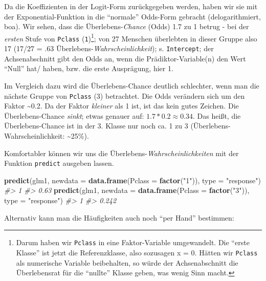 \documentclass[12pt,ngerman,]{book}
\makeatletter
\newenvironment{Shaded}{\begin{snugshade}}{\end{snugshade}}
\newcommand{\KeywordTok}[1]{\textcolor[rgb]{0.13,0.29,0.53}{\textbf{{#1}}}}
\newcommand{\DataTypeTok}[1]{\textcolor[rgb]{0.13,0.29,0.53}{{#1}}}
\newcommand{\StringTok}[1]{\textcolor[rgb]{0.31,0.60,0.02}{{#1}}}
\newcommand{\CommentTok}[1]{\textcolor[rgb]{0.56,0.35,0.01}{\textit{{#1}}}}
\newcommand{\NormalTok}[1]{{#1}}
\let\rmarkdownfootnote\footnote%
\def\footnote{\protect\rmarkdownfootnote}
\newenvironment{kframe}{%
\medskip{}
\setlength{\fboxsep}{.8em}
 \def\at@end@of@kframe{}%
 \ifinner\ifhmode%
  \def\at@end@of@kframe{\end{minipage}}%
  \begin{minipage}{\columnwidth}%
 \fi\fi%
 \def\FrameCommand##1{\hskip\@totalleftmargin \hskip-\fboxsep
 \colorbox{shadecolor}{##1}\hskip-\fboxsep
     \hskip-\linewidth \hskip-\@totalleftmargin \hskip\columnwidth}%
 \MakeFramed {\advance\hsize-\width
   \@totalleftmargin\z@ \linewidth\hsize
   \@setminipage}}%
 {\par\unskip\endMakeFramed%
 \at@end@of@kframe}
\renewenvironment{Shaded}{\begin{kframe}}{\end{kframe}}
\makeatother
\begin{document}
Da die Koeffizienten in der Logit-Form zurückgegeben werden, haben wir
sie mit der Exponential-Funktion in die ``normale'' Odds-Form gebracht
(delogarithmiert, boa). Wir sehen, dass die Überlebens-\emph{Chance}
(Odds) 1.7 zu 1 betrug - bei der \emph{ersten} Stufe von \texttt{Pclass}
(\texttt{1})\footnote{Darum haben wir \texttt{Pclass} in eine
  Faktor-Variable umgewandelt. Die ``erste Klasse'' ist jetzt die
  Referenzklasse, also sozusagen x = 0. Hätten wir \texttt{Pclass} als
  numerische Variable beibehalten, so würde der Achsenabschnitt die
  Überlebensrat für die ``nullte'' Klasse geben, was wenig Sinn macht.};
von 27 Menschen überlebten in dieser Gruppe also 17 (17/27 = .63
Überlebens-\emph{Wahrscheinlichkeit}); s. \texttt{Intercept}; der
Achsenabschnitt gibt den Odds an, wenn die Prädiktor-Variable(n) den
Wert ``Null'' hat/ haben, bzw. die erste Ausprägung, hier 1.

Im Vergleich dazu wird die Überlebens-Chance deutlich schlechter, wenn
man die nächste Gruppe von \texttt{Pclass} (3) betrachtet. Die Odds
verändern sich um den Faktor \textasciitilde{}0.2. Da der Faktor
\emph{kleiner} als 1 ist, ist das kein gutes Zeichen. Die
Überlebens-Chance \emph{sinkt}; etwas genauer auf:
\(1.7 * 0.2 \approx 0.34\). Das heißt, die Überlebens-Chance ist in der
3. Klasse nur noch ca. 1 zu 3 (Überlebens-Wahrscheinlichkeit:
\textasciitilde{}25\%).

Komfortabler können wir uns die Überlebens-\emph{Wahrscheinlichkeiten}
mit der Funktion \texttt{predict} ausgeben lassen.

\begin{Shaded}
\begin{Highlighting}[]
\KeywordTok{predict}\NormalTok{(glm1, }\DataTypeTok{newdata =} \KeywordTok{data.frame}\NormalTok{(}\DataTypeTok{Pclass =} \KeywordTok{factor}\NormalTok{(}\StringTok{"1"}\NormalTok{)), }\DataTypeTok{type =} \StringTok{"response"}\NormalTok{)}
\CommentTok{#>    1 }
\CommentTok{#> 0.63}
\KeywordTok{predict}\NormalTok{(glm1, }\DataTypeTok{newdata =} \KeywordTok{data.frame}\NormalTok{(}\DataTypeTok{Pclass =} \KeywordTok{factor}\NormalTok{(}\StringTok{"3"}\NormalTok{)), }\DataTypeTok{type =} \StringTok{"response"}\NormalTok{)}
\CommentTok{#>     1 }
\CommentTok{#> 0.242}
\end{Highlighting}
\end{Shaded}

Alternativ kann man die Häufigkeiten auch noch ``per Hand'' bestimmen:
\end{document}
